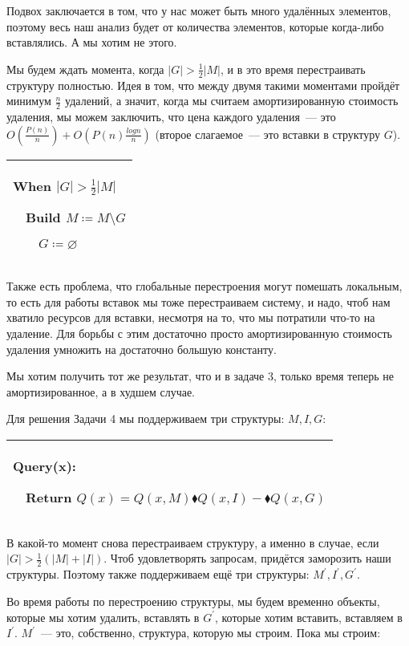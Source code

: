 Подвох заключается в том, что у нас может быть много удалённых элементов, поэтому весь наш анализ будет от количества элементов, которые когда-либо вставлялись. А мы хотим не этого.

Мы будем ждать момента, когда $|G| > \frac{1}{2}|M|$, и в это время перестраивать структуру полностью. Идея в том, что между двумя такими моментами пройдёт минимум $\frac{n}{2}$ удалений, а значит, когда мы считаем амортизированную стоимость удаления, мы можем заключить, что цена каждого удаления~--- это
$O\left(\frac{P(n)}{n}\right) + O\left(P(n)\frac{log n}{n}\right)$ (второе слагаемое~--- это вставки в структуру $G$).


\begin{tabular}{|p{5cm}|}
	\hline

	When $|G| > \frac{1}{2}|M|$

	$\quad$Build $M \coloneqq M\setminus G$

	$\quad$$\quad$$G \coloneqq \varnothing$ \\

	\hline
\end{tabular}

Также есть проблема, что глобальные перестроения могут помешать локальным, то есть для работы вставок мы тоже перестраиваем систему, и надо, чтоб нам хватило ресурсов для вставки, несмотря на то, что мы потратили что-то на удаление. Для борьбы с этим достаточно просто амортизированную стоимость удаления умножить на достаточно большую константу.


\begin{task}
	Мы хотим получить тот же результат, что и в задаче 3, только время теперь не амортизированное, а в худшем случае.
\end{task}

Для решения Задачи 4 мы поддерживаем три структуры: $M,I,G$:


\begin{tabular}{|p{8cm}|}
	\hline
	Query(x):

	$\quad$Return $Q(x) = Q(x,M)\blacklozenge Q(x,I) - \blacklozenge Q(x,G)$ \\
	\hline
\end{tabular}


В какой-то момент снова перестраиваем структуру, а именно в случае, если $|G| > \frac{1}{2}(|M| + |I|)$. Чтоб удовлетворять запросам, придётся заморозить наши структуры. Поэтому также поддерживаем ещё три структуры: $M^\prime,I^\prime,G^\prime$.

Во время работы по перестроению структуры, мы будем временно объекты, которые мы хотим удалить, вставлять в $G^\prime$, которые хотим вставить, вставляем в $I^\prime$. $M^\prime$~--- это, собственно, структура, которую мы строим. Пока мы строим:


